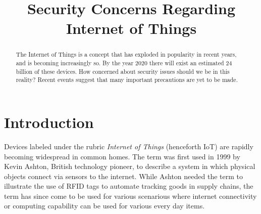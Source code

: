 \documentclass[a4paper, conference]{IEEEtran/IEEEtran}
\begin{document}
%
\title{Security Concerns Regarding Internet of Things}

\author{
}

\maketitle

\begin{abstract}
The Internet of Things is a concept that has exploded in popularity in recent years, and is becoming increasingly so. By the year 2020 there will exist an estimated 24 billion of these devices.\cite{meola} How concerned about security issues should we be in this reality? Recent events suggest that many important precautions are yet to be made.
\end{abstract}

%
\IEEEpeerreviewmaketitle

\section{Introduction}
Devices labeled under the rubric \textit{Internet of Things} (henceforth IoT) are rapidly becoming widespread in common homes.\cite{mulani} The term was first used in 1999 by Kevin Ashton, British technology pioneer, to describe a system in which physical objects connect via sensors to the internet. While Ashton needed the term to illustrate the use of RFID tags to automate tracking goods in supply chains, the term has since come to be used for various scenarious where internet connectivity or computing capability can be used for various every day items. 
\end{document}
